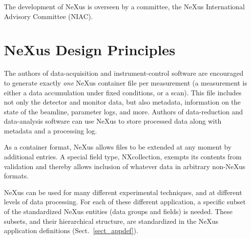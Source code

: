 \documentclass[%
 aip,
rsi,
 amsmath,amssymb,
 reprint,%
]{revtex4-1}
\begin{document}
The development of NeXus is overseen by a committee, the NeXus International Advisory Committee (NIAC).

\section{NeXus Design Principles}

The authors of data-acquisition and instrument-control software are encouraged to generate exactly \emph{one} NeXus container file per measurement
(a measurement is either a data accumulation under fixed conditions,
or a scan).
This file includes not only the detector and monitor data,
but also metadata, information on the state of the beamline, parameter logs, and more.
Authors of data-reduction and data-analysis software can use NeXus to
store processed data along with metadata and a processing log.

As a container format, NeXus allows files to be extended at any moment by
additional entries.
A special field type, NXcollection, exempts its contents from validation
and thereby allows inclusion of whatever data in arbitrary non-NeXus formats.

NeXus can be used for many different experimental techniques,
and at different levels of data processing.
For each of these different application,
a specific subset of the standardized NeXus entities 
(data groups and fields) is needed.
These subsets, and their hierarchical structure, are standardized
in the NeXus application definitions (Sect.~\ref{sect_appdef}).
\end{document}
